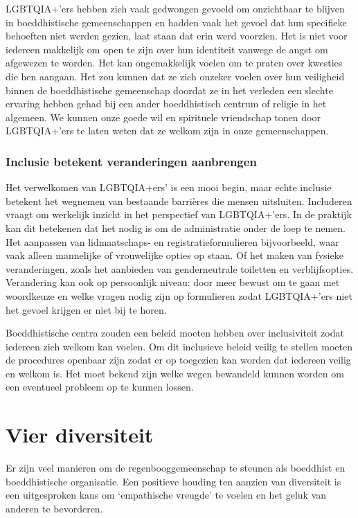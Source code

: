 \documentclass[12pt,openany]{book}
\begin{document}
LGBTQIA+’ers hebben zich vaak gedwongen gevoeld om onzichtbaar te blijven in boeddhistische gemeenschappen en hadden vaak het gevoel dat hun specifieke behoeften niet werden gezien, laat staan dat erin werd voorzien.  Het is niet voor iedereen makkelijk om open te zijn over hun identiteit vanwege de angst om afgewezen te worden. Het kan ongemakkelijk voelen om te praten over kwesties die hen aangaan. Het zou kunnen dat ze zich onzeker voelen over hun veiligheid binnen de boeddhistische gemeenschap doordat ze in het verleden een slechte ervaring hebben gehad bij een ander boeddhistisch centrum of religie in het algemeen. We kunnen onze goede wil en spirituele vriendschap tonen door LGBTQIA+’ers te laten weten dat ze welkom zijn in onze gemeenschappen.

\subsubsection*{Inclusie betekent veranderingen aanbrengen}

Het verwelkomen van LGBTQIA+ers’ is een mooi begin, maar echte inclusie betekent het wegnemen van bestaande barrières die mensen uitsluiten. Includeren vraagt om werkelijk inzicht in het perspectief van LGBTQIA+’ers. In de praktijk kan dit betekenen dat het nodig is om de administratie onder de loep te nemen. Het aanpassen van lidmaatschaps- en registratieformulieren bijvoorbeeld, waar vaak alleen mannelijke of vrouwelijke opties op staan. Of het maken van fysieke veranderingen, zoals het aanbieden van genderneutrale toiletten en verblijfsopties.  Verandering kan ook op persoonlijk niveau: door meer bewust om te gaan met woordkeuze en welke vragen nodig zijn op formulieren zodat LGBTQIA+’ers niet het gevoel krijgen er niet bij te horen.

Boeddhistische centra zouden een beleid moeten hebben over inclusiviteit zodat iedereen zich welkom kan voelen. Om dit inclusieve beleid veilig te stellen moeten de procedures openbaar zijn zodat er op toegezien kan worden dat iedereen veilig en welkom is. Het moet bekend zijn welke wegen bewandeld kunnen worden om een eventueel probleem op te kunnen lossen.

\section*{Vier diversiteit} 

Er zijn veel manieren om de regenbooggemeenschap te steunen als boeddhist en boeddhistische organisatie. Een positieve houding ten aanzien van diversiteit is een uitgesproken kans om ‘empathische vreugde’ te voelen en het geluk van anderen te bevorderen.
\end{document}
